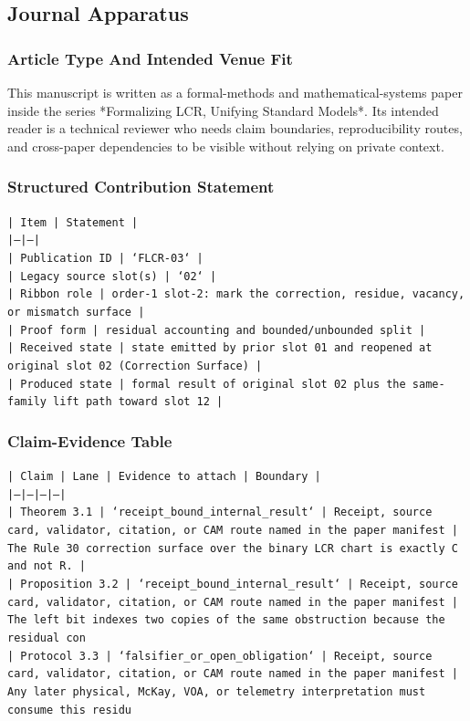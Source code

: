 \documentclass[11pt]{article}
\begin{document}
\subsection*{Journal Apparatus}

\subsubsection*{Article Type And Intended Venue Fit}

This manuscript is written as a formal-methods and mathematical-systems paper
inside the series *Formalizing LCR, Unifying Standard Models*. Its intended
reader is a technical reviewer who needs claim boundaries, reproducibility
routes, and cross-paper dependencies to be visible without relying on private
context.

\subsubsection*{Structured Contribution Statement}

\noindent\texttt{| Item | Statement |}\\
\noindent\texttt{|---|---|}\\
\noindent\texttt{| Publication ID | `FLCR-03` |}\\
\noindent\texttt{| Legacy source slot(s) | `02` |}\\
\noindent\texttt{| Ribbon role | order-1 slot-2: mark the correction, residue, vacancy, or mismatch surface |}\\
\noindent\texttt{| Proof form | residual accounting and bounded/unbounded split |}\\
\noindent\texttt{| Received state | state emitted by prior slot 01 and reopened at original slot 02 (Correction Surface) |}\\
\noindent\texttt{| Produced state | formal result of original slot 02 plus the same-family lift path toward slot 12 |}\\

\subsubsection*{Claim-Evidence Table}

\noindent\texttt{| Claim | Lane | Evidence to attach | Boundary |}\\
\noindent\texttt{|---|---|---|---|}\\
\noindent\texttt{| Theorem 3.1 | `receipt\_bound\_internal\_result` | Receipt, source card, validator, citation, or CAM route named in the paper manifest | The Rule 30 correction surface over the binary LCR chart is exactly C and not R. |}\\
\noindent\texttt{| Proposition 3.2 | `receipt\_bound\_internal\_result` | Receipt, source card, validator, citation, or CAM route named in the paper manifest | The left bit indexes two copies of the same obstruction because the residual con}\\
\noindent\texttt{| Protocol 3.3 | `falsifier\_or\_open\_obligation` | Receipt, source card, validator, citation, or CAM route named in the paper manifest | Any later physical, McKay, VOA, or telemetry interpretation must consume this residu}\\
\end{document}
